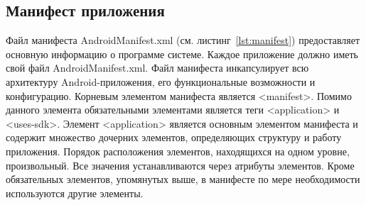 \subsection{Манифест приложения}
Файл манифеста AndroidManifest.xml (см. листинг~\ref{lst:manifest}) предоставляет основную информацию о программе системе. Каждое приложение должно иметь свой файл AndroidManifest.xml. Файл манифеста инкапсулирует всю архитектуру Android-приложения, его функциональные возможности и конфигурацию. Корневым элементом манифеста является <manifest>. Помимо данного элемента обязательными элементами является теги <application> и <uses-sdk>. Элемент <application> является основным элементом манифеста и содержит множество дочерних элементов, определяющих структуру и работу приложения. Порядок расположения элементов, находящихся на одном уровне, произвольный. Все значения устанавливаются через атрибуты элементов. Кроме обязательных элементов, упомянутых выше, в манифесте по мере необходимости используются другие элементы.

